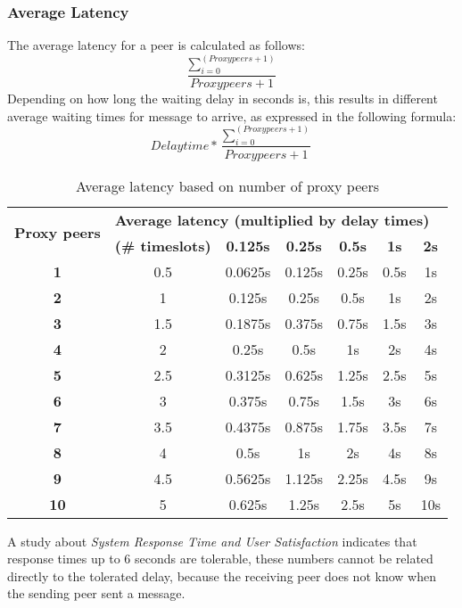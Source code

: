 \subsubsection{Average Latency}
The average latency for a peer is calculated as follows:
$$\frac{\sum\limits_{i=0}^{(Proxy peers +1)}}{Proxy peers + 1}$$
Depending on how long the waiting delay in seconds is, this results
in different average waiting times for message to arrive, as expressed in
the following formula:
$$Delaytime * \frac{\sum\limits_{i=0}^{(Proxy peers +1)}}{Proxy peers + 1}$$

\begin{longtable}{|c|c|c|c|c|c|c|}
\caption{Average latency based on number of proxy peers}
\label{avglatencypeers}\\
\hline
\multirow{2}{*}{\textbf{Proxy peers}} & \multicolumn{6}{|l|}{\textbf{Average latency (multiplied by delay times)}} \\
& \textbf{(\# timeslots)} & \textbf{0.125s} & \textbf{0.25s} & \textbf{0.5s} & \textbf{1s} & \textbf{2s}\\
\hline
\textbf{1} & 0.5 & 0.0625s & 0.125s & 0.25s & 0.5s & 1s\\
\hline
\textbf{2} & 1 & 0.125s & 0.25s & 0.5s & 1s & 2s\\
\hline
\textbf{3} & 1.5 & 0.1875s & 0.375s & 0.75s & 1.5s & 3s\\
\hline
\textbf{4} & 2 & 0.25s & 0.5s & 1s & 2s & 4s\\
\hline
\textbf{5} & 2.5 & 0.3125s & 0.625s & 1.25s & 2.5s & 5s\\
\hline
\textbf{6} & 3 & 0.375s & 0.75s & 1.5s & 3s & 6s\\
\hline
\textbf{7} & 3.5 & 0.4375s & 0.875s & 1.75s & 3.5s & 7s\\
\hline
\textbf{8} & 4 & 0.5s & 1s & 2s & 4s & 8s\\
\hline
\textbf{9} & 4.5 & 0.5625s & 1.125s & 2.25s & 4.5s & 9s\\
\hline
\textbf{10} & 5 & 0.625s & 1.25s & 2.5s & 5s & 10s\\
\hline
\end{longtable}
A study about 
\textit{System Response Time and User Satisfaction}\cite{responsetime}
indicates that response times up to 6 seconds are tolerable, these numbers
cannot be related directly to the tolerated delay, because the receiving
peer does not know when the sending peer sent a message.
